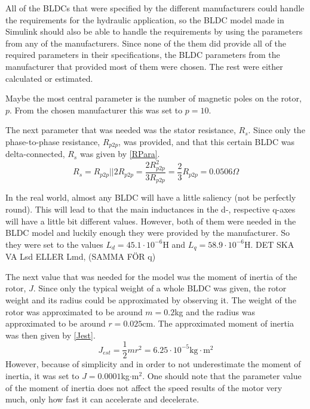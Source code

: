 \documentclass{LTHthesis}
\begin{document}
All of the BLDCs that were specified by the different manufacturers could handle the requirements for the hydraulic application, so the BLDC model made in Simulink should also be able to handle the requirements by using the parameters from any of the manufacturers. Since none of the them did  provide all of the required parameters in their specifications, the BLDC parameters from the manufacturer that provided most of them were chosen. The rest were either calculated or estimated.

Maybe the most central parameter is the number of magnetic poles on the rotor,  $p$. From the chosen manufacturer this was set to $p=10$.

The next parameter that was needed was the stator resistance, $R_{s}$. Since only the phase-to-phase resistance, $R_{p2p}$, was provided, and that this certain BLDC was delta-connected, $R_{s}$ was given by \eqref{RPara}.
\begin{equation} \label{RPara}
R_{s}=R_{p2p}||2R_{p2p}=\frac{2R_{p2p}^{2}}{3R_{p2p}}=\frac{2}{3}R_{p2p}=0.0506\Omega
\end{equation}

In the real world, almost any BLDC will have a little saliency (not be perfectly round). This will lead to that the main inductances in the d-, respective q-axes will have a little bit different values. However, both of them were needed in the BLDC model and luckily enough they were provided by the manufacturer. So they were set to the values $L_{d}=45.1\cdot10^{-6}$H and $L_{q}=58.9\cdot10^{-6}$H.
DET SKA VA Lsd ELLER Lmd, (SAMMA FÖR q)

The next value that was needed for the model was the moment of inertia of the rotor, $J$. Since only the typical weight of a whole BLDC was given, the rotor weight and its radius could be approximated by observing it. The weight of the rotor was approximated to be around $m=0.2$kg and the radius was approximated to be around $r=0.025$cm. The approximated moment of inertia was then given by \eqref{Jest}.
\begin{equation} \label{Jest}
J_{est}=\frac{1}{2}mr^{2}=6.25\cdot10^{-5}\mathrm{kg}\cdot\mathrm{m}^{2}
\end{equation}
However, because of simplicity and in order to not underestimate the moment of inertia, it was set to $J=0.0001$kg$\cdot $m$^{2}$. One should note that the parameter value of the moment of inertia does not affect the speed results of the motor very much, only how fast it can accelerate and decelerate.
\end{document}
